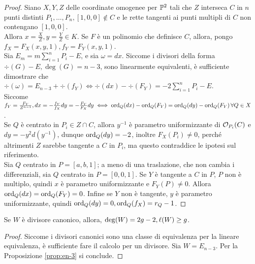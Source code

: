         \begin{proof}
            Siano $X,Y,Z$ delle coordinate omogenee per $\P^2$ tali che $Z$ interseca $C$ in $n$ punti distinti $P_1,\ldots,P_n, [1,0,0] \notin C$ e le rette tangenti ai punti multipli di $C$ non contengano 
            $[1,0,0]$.\\
            Allora $x = \frac{X}{Z}, y = \frac{Y}{Z} \in K$. Se $F$ è un polinomio che definisce $C$, allora, pongo $f_X = F_X(x,y,1),f_Y = F_Y(x,y,1)$.\\
            Sia $E_m = m \sum_{i=1}^n P_i - E$, e sia $\omega = dx$. Siccome i divisori della forma $\div(G) - E, \deg(G) = n-3$, sono linearmente equivalenti, è sufficiente dimostrare che $\div(\omega) = 
            E_{n-3} + \div(f_Y) \iff \div(dx) - \div(F_Y) = -2 \sum_{i=1}^n P_i - E$.\\
            Siccome $f_Y = \frac{F_Y}{Z^{n-1}}, dx = - \frac{f_Y}{f_X}dy = - \frac{F_Y}{F_X}dy \iff \ord_Q(dx) - \ord_Q(F_Y) = \ord_Q(dy) - \ord_Q(F_Y) \, \forall Q \in X$. \\
            Se $Q$ è centrato in $P_i \in Z \cap C$, allora $y^{-1}$ è parametro uniformizzante di $\cO_{P_i}(C)$ e $dy = -y^2d(y^{-1})$, dunque $\ord_Q(dy) = -2$, inoltre $F_X(P_i) \neq 0$, perché altrimenti 
            $Z$ sarebbe tangente a $C$ in $P_i$, ma questo contraddice le ipotesi sul riferimento. \\
            Sia $Q$ centrato in $P = [a,b,1]$; a meno di una traslazione, che non cambia i differenziali, sia $Q$ centrato in $P = [0,0,1]$. Se $Y$ è tangente a $C$ in $P$, $P$ non è multiplo, quindi $x$ è parametro 
            uniformizzante e $F_Y(P) \neq 0$. Allora $\ord_Q(dx) = \ord_Q(F_Y) = 0$. Infine se $Y$ non è tangente, $y$ è parametro uniformizzante, quindi $\ord_Q(dy) = 0, \ord_Q(f_X) = r_Q -1$.
        \end{proof}
        \begin{corollario}
            Se $W$ è divisore canonico, allora, $\deg(W) = 2g - 2, \l(W) \geq g$.
        \end{corollario}
        \begin{proof}
            Siccome i divisori canonici sono una classe di equivalenza per la lineare equivalenza, è sufficiente fare il calcolo per un divisore. Sia $W = E_{n-3}$. Per la Proposizione \ref{prop:en-3} si conclude.
        \end{proof}